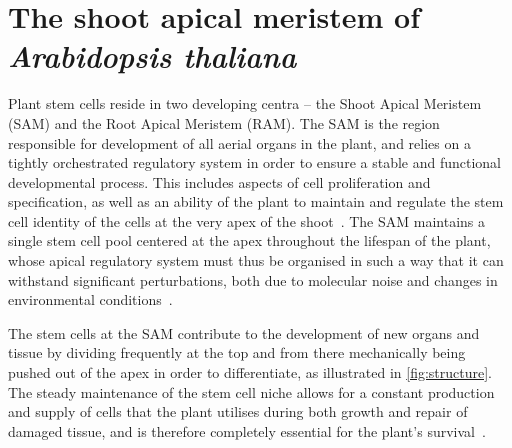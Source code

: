 
\section{The shoot apical meristem of \textit{Arabidopsis thaliana}} %
\label{sec:arabidopsis}
Plant stem cells reside in two developing centra -- the Shoot Apical
Meristem (SAM) and the Root Apical Meristem (RAM). The SAM is the region
responsible for development of all aerial organs in the plant, and relies on a
tightly orchestrated regulatory system in order to ensure a stable and functional
developmental process. This includes
aspects of cell proliferation and specification, as well as an ability of the plant to
maintain and regulate the stem cell identity of the cells at the very apex of
the shoot~\cite{clark2001cell}. The SAM maintains a single stem cell pool centered at the
apex throughout the lifespan of the plant, whose apical regulatory system must
thus be organised in such a way that it can withstand    
significant perturbations, both due to molecular noise and changes in environmental
conditions~\cite{heidstra2014plant}.

The stem cells at the SAM contribute to the development of new organs and
tissue by dividing frequently at the top and from there 
mechanically being pushed out of the apex in order to differentiate, as
illustrated in \cref{fig:structure}. The steady
maintenance of the stem cell niche allows for a constant production and supply
of cells that the plant utilises during both growth and repair of damaged
tissue, and is therefore completely essential for the plant's
survival~\cite{heidstra2014plant}.

